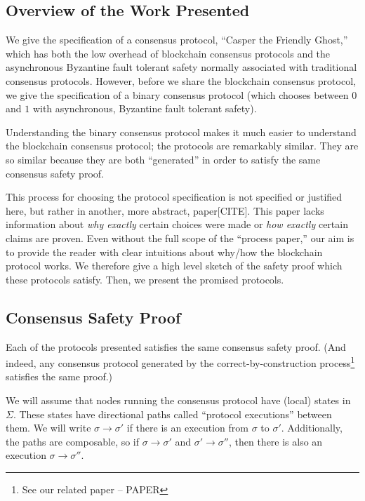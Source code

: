 \documentclass{article}
\theoremstyle{definition}
\begin{document}
\subsection{Overview of the Work Presented}

We give the specification of a consensus protocol, ``Casper the Friendly Ghost,'' which has both the low overhead of blockchain consensus protocols and the asynchronous Byzantine fault tolerant safety normally associated with traditional consensus protocols. However, before we share the blockchain consensus protocol, we give the specification of a binary consensus protocol (which chooses between $0$ and $1$ with asynchronous, Byzantine fault tolerant safety).

Understanding the binary consensus protocol makes it much easier to understand the blockchain consensus protocol; the protocols are remarkably similar. They are so similar because they are both ``generated'' in order to satisfy the same consensus safety proof.

This process for choosing the protocol specification is not specified or justified here, but rather in another, more abstract, paper[CITE]. This paper lacks information about \emph{why exactly} certain choices were made or \emph{how exactly} certain claims are proven. Even without the full scope of the ``process paper,'' our aim is to provide the reader with clear intuitions about why/how the blockchain protocol works. We therefore give a high level sketch of the safety proof which these protocols satisfy. Then, we present the promised protocols.

\subsection{Consensus Safety Proof}

Each of the protocols presented satisfies the same consensus safety proof. (And indeed, any consensus protocol generated by the correct-by-construction process\footnote{See our related paper -- PAPER} satisfies the same proof.)

We will assume that nodes running the consensus protocol have (local) states in $\Sigma$. These states have directional paths called ``protocol executions'' between them. We will write $\sigma \to \sigma'$ if there is an execution from $\sigma$ to $\sigma'$. Additionally, the paths are composable, so if $\sigma \to \sigma'$ and $\sigma' \to \sigma''$, then there is also an execution $\sigma \to \sigma''$.
\end{document}
